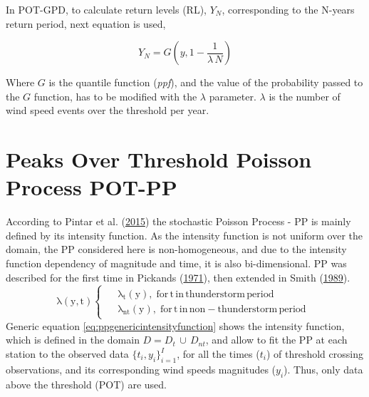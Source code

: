 \documentclass[12pt,oneside]{reedthesis}
\begin{document}
In POT-GPD, to calculate return levels (RL), \(Y_N\), corresponding to the N-years return period, next equation is used,

\[
Y_N =G\left(y, 1-\frac{1}{\lambda\,N}\right)
\]

Where \(G\) is the quantile function (\emph{ppf}), and the value of the probability passed to the \(G\) function, has to be modified with the \(\lambda\) parameter. \(\lambda\) is the number of wind speed events over the threshold per year.

\hypertarget{method-pot-pp}{%
\section{Peaks Over Threshold Poisson Process POT-PP}\label{method-pot-pp}}

According to Pintar et al. (\protect\hyperlink{ref-Pintar2015}{2015}) the stochastic Poisson Process - PP is mainly defined by its intensity function. As the intensity function is not uniform over the domain, the PP considered here is non-homogeneous, and due to the intensity function dependency of magnitude and time, it is also bi-dimensional. PP was described for the first time in Pickands (\protect\hyperlink{ref-Pickands1971}{1971}), then extended in Smith (\protect\hyperlink{ref-Smith1989}{1989}).
\begin{equation}
  \mathrm{
    \lambda\left(y,t\right)
    \begin{cases}
      \begin{split}
            &\lambda_t(y),\;for\,t\,in\,thunderstorm\,period
            \\
            &\lambda_{nt}(y),\;for\,t\,in\,non-thunderstorm\,period      
      \end{split}
    \end{cases}
  }
  \label{eq:ppgenericintensityfunction}
\end{equation}
Generic equation \eqref{eq:ppgenericintensityfunction} shows the intensity function, which is defined in the domain \(D = D_t\,{\cup}\,D_{nt}\), and allow to fit the PP at each station to the observed data \(\{t_i, y_i\}_{i=1}^I\), for all the times (\(t_i\)) of threshold crossing observations, and its corresponding wind speeds magnitudes (\(y_i\)). Thus, only data above the threshold (POT) are used.
\end{document}
